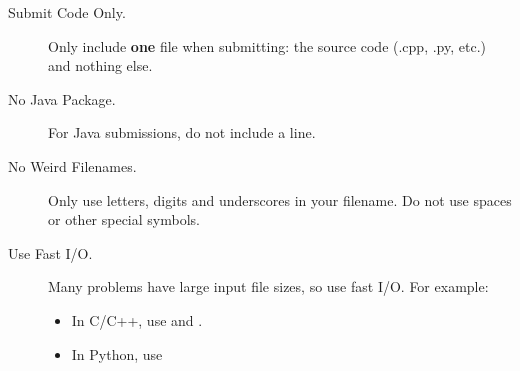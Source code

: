 \begin{description}
\item[Submit Code Only.]
Only include \textbf{one} file when submitting: the source code (.cpp, .py, etc.) and nothing else.

\item[No Java Package.]
For Java submissions, do not include a  line.


\item[No Weird Filenames.]
Only use letters, digits and underscores in your filename. Do not use spaces or other special symbols.

\item[Use Fast I/O.]
Many problems have large input file sizes, so use fast I/O. For example:
\begin{itemize}
\item In C/C++, use  and .
\item In Python, use 
\end{itemize}

\prefacenotesIO{}




\end{description}

